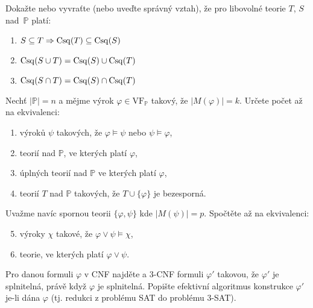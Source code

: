\documentclass[a4paper,12pt]{article}
\begin{document}
    \medskip\begin{problem}
        Dokažte nebo vyvraťte (nebo uveďte správný vztah), že pro libovolné teorie $T$, $S$ nad~$\mathbb{P}$ platí:
        \begin{enumerate}
            \item $S\subseteq T \Rightarrow \operatorname{Csq}(T) \subseteq \operatorname{Csq}(S)$
            \item $\operatorname{Csq}(S\cup T)=\operatorname{Csq}(S) \cup \operatorname{Csq}(T)$
            \item $\operatorname{Csq}(S\cap T)=\operatorname{Csq}(S) \cap \operatorname{Csq}(T)$
        \end{enumerate}
        \end{problem}
        

\medskip\begin{problem}
    Nechť $|\mathbb{P}|=n$ a mějme výrok $\varphi\in\mathrm{VF}_{\mathbb{P}}$ takový, že $|M(\varphi)|=k$. Určete počet až na ekvivalenci:
    \begin{enumerate}
    \item výroků $\psi$ takových, že $\varphi \models \psi$ nebo $\psi \models \varphi$,
    \item teorií nad $\mathbb{P}$, ve kterých platí $\varphi$,
    \item úplných teorií nad $\mathbb{P}$ ve kterých platí $\varphi$,
    \item teorií $T$ nad $\mathbb{P}$ takových, že $T \cup \{\varphi\}$ je bezesporná.
    \end{enumerate}
    Uvažme navíc spornou teorii $\{\varphi,\psi\}$ kde $|M(\psi)|=p$. Spočtěte až na ekvivalenci:
    \begin{enumerate}
    \setcounter{enumi}{4}
    \item výroky $\chi$ takové, že $\varphi \vee \psi \models \chi$, 
    \item teorie, ve kterých platí $\varphi \vee \psi$.
    \end{enumerate}
\end{problem}



\medskip\begin{problem} Pro danou formuli $\varphi$ v CNF najděte a 3-CNF formuli $\varphi'$ takovou, že $\varphi'$ je splnitelná, právě když $\varphi$ je splnitelná. Popište efektivní algoritmus konstrukce $\varphi'$ je-li dána $\varphi$ (tj. redukci z problému SAT do problému 3-SAT).
\end{problem}
\end{document}
